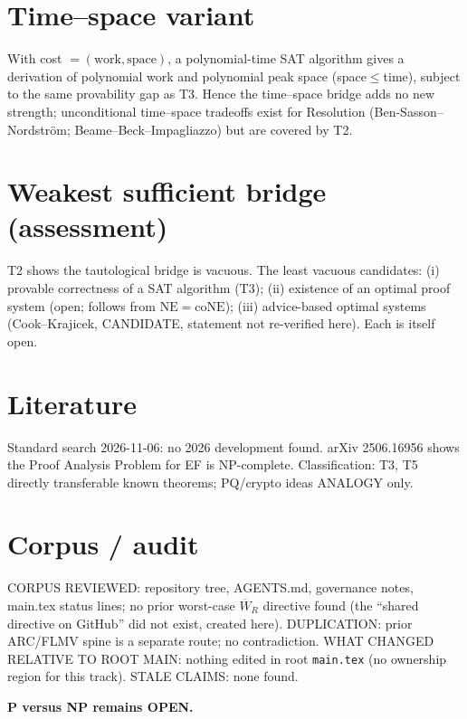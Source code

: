 \documentclass[11pt]{article}
\begin{document}
\section*{Time--space variant}
With cost $=(\text{work},\text{space})$, a polynomial-time SAT algorithm gives a derivation of polynomial work and polynomial peak space (space$\le$time), subject to the same provability gap as T3. Hence the time--space bridge adds no new strength; unconditional time--space tradeoffs exist for Resolution (Ben-Sasson--Nordstr\"om; Beame--Beck--Impagliazzo) but are covered by T2.

\section*{Weakest sufficient bridge (assessment)}
T2 shows the tautological bridge is vacuous. The least vacuous candidates: (i) provable correctness of a SAT algorithm (T3); (ii) existence of an optimal proof system (open; follows from $\mathrm{NE}=\mathrm{coNE}$); (iii) advice-based optimal systems (Cook--Krajicek, CANDIDATE, statement not re-verified here). Each is itself open.

\section*{Literature}
Standard search 2026-11-06: no 2026 development found. arXiv 2506.16956 shows the Proof Analysis Problem for EF is NP-complete. Classification: T3, T5 directly transferable known theorems; PQ/crypto ideas ANALOGY only.

\section*{Corpus / audit}
CORPUS REVIEWED: repository tree, AGENTS.md, governance notes, main.tex status lines; no prior worst-case $\overline W_R$ directive found (the ``shared directive on GitHub'' did not exist, created here). DUPLICATION: prior ARC/FLMV spine is a separate route; no contradiction. WHAT CHANGED RELATIVE TO ROOT MAIN: nothing edited in root \texttt{main.tex} (no ownership region for this track). STALE CLAIMS: none found.

\textbf{P versus NP remains OPEN.}
\end{document}
